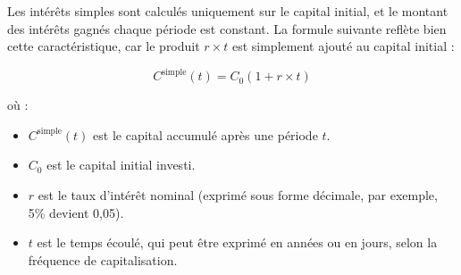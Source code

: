 \documentclass{article}
\begin{document}
\begin{tcolorbox}[
        colback=lightgreen, 
        colframe=lightgreen, 
        boxrule=0.5pt, 
        arc=0pt, 
        left=10pt, 
        right=10pt, 
        top=6pt, 
        bottom=6pt, 
        boxsep=2pt, 
        before upper={\faLightbulb\hspace{10pt}}
    ]
        Les intérêts simples sont calculés uniquement sur le capital initial, et le montant des intérêts gagnés chaque période est constant. La formule suivante reflète bien cette caractéristique, car le produit \( r \times t \) est simplement ajouté au capital initial :

        \[
        C^{\text{simple}}(t) = C_0 \left(1 + r \times t\right)
        \]
        
        où :
        \begin{itemize}
            \item \( C^{\text{simple}}(t) \) est le capital accumulé après une période \( t \).
            \item \( C_0 \) est le capital initial investi.
            \item \( r \) est le taux d'intérêt nominal (exprimé sous forme décimale, par exemple, 5\% devient 0,05).
            \item \( t \) est le temps écoulé, qui peut être exprimé en années ou en jours, selon la fréquence de capitalisation.
        \end{itemize}
    \end{tcolorbox}
\end{document}
